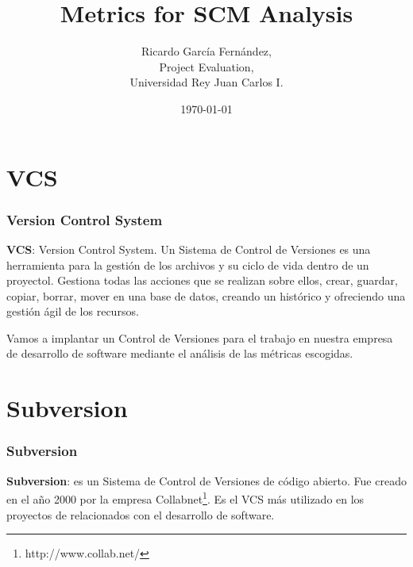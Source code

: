 \documentclass[xcolor=dvipsnames]{beamer}
\title{Metrics for SCM Analysis}
\author{Ricardo Garc\'ia Fern\'andez,\\
        Project Evaluation,\\
        Universidad Rey Juan Carlos I.}
\date{\today}
\begin{document}


\section[Index]{}
\begin{frame}[allowframebreaks]
\tableofcontents
\end{frame}

\section{VCS}
\begin{frame}[allowframebreaks]
\frametitle{Version Control System}

\textbf{VCS}: Version Control System. Un Sistema de Control de Versiones es una herramienta para la gesti\'on de los archivos y su ciclo de vida dentro de un proyectol. Gestiona todas las acciones que se realizan sobre ellos, crear, guardar, copiar, borrar, mover en una base de datos, creando un hist\'orico y ofreciendo una gesti\'on \'agil de los recursos.

Vamos a implantar un Control de Versiones para el trabajo en nuestra empresa de desarrollo de software mediante el an\'alisis de las m\'etricas escogidas.

\end{frame}

\section{Subversion}
\begin{frame}[allowframebreaks]
\frametitle{Subversion}
\textbf{Subversion}: es un Sistema de Control de Versiones de c\'odigo abierto.
Fue creado en el a\~no 2000 por la empresa Collabnet\footnote{http://www.collab.net/}.
Es el VCS m\'as utilizado en los proyectos de relacionados con el desarrollo de software.
\end{frame}
\end{document}
